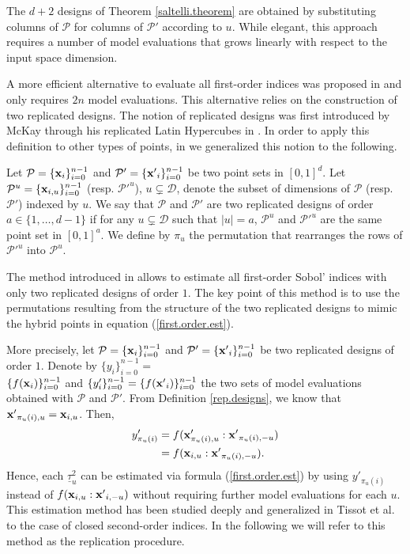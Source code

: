 The $d+2$ designs of Theorem \ref{saltelli.theorem} are obtained by substituting columns of $\mathcal{P}$ for columns of $\mathcal{P}'$ {\color{purple}according} to $u$. While elegant, this approach requires a number of model evaluations that grows linearly with respect to the input space dimension.

A more efficient alternative to evaluate all first-order indices was proposed in \cite{Mara} and only requires $2n$ model evaluations. This alternative relies on the construction of two replicated designs. The notion of replicated designs was first introduced by McKay through his replicated Latin Hypercubes in \cite{McKay}. In order to apply this definition to other types of points, in \cite{GJAHMP} we generalized this notion to the following.
\begin{definition}
\label{rep.designs}
Let $\mathcal{P}=\{\boldsymbol{\mathbf{x}}_i\}_{i=0}^{n-1}$ and $\mathcal{P}'=\{{\boldsymbol{\mathbf{x}}'}_i\}_{i=0}^{n-1}$ be two point sets in
$[0,1]^{d}$. Let $\mathcal{P}^u=\{\boldsymbol{\mathbf{x}}_{i,u}\}_{i=0}^{n-1}$ (resp. ${\mathcal{P}'}^u$), $u \subsetneq \mathcal{D}$, denote the subset of dimensions of $\mathcal{P}$ (resp. $\mathcal{P}'$) indexed by $u$. We say that $\mathcal{P}$ and $\mathcal{P}'$ are two replicated designs of order $a \in \{1,\dots,d-1\}$ if for any $u \subsetneq \mathcal{D}$ such that $|u|=a$, $\mathcal{P}^u$ and ${\mathcal{P}'}^u$ are the same point set in $[0,1]^a$. We define by $\pi_u$ the permutation that rearranges the rows of ${\mathcal{P}'}^u$ into $\mathcal{P}^u$.
\end{definition}
The method introduced in \cite{Mara} allows to estimate all first-order Sobol' indices with only two replicated designs of order $1$. The key point of this method is to use the permutations resulting from the structure of the two replicated designs to mimic the hybrid points in equation (\ref{first.order.est}). 

More precisely, let $\mathcal{P}=\{\boldsymbol{\mathbf{x}}_i\}_{i=0}^{n-1}$ and $\mathcal{P}'=\{{\boldsymbol{\mathbf{x}}'}_i\}_{i=0}^{n-1}$ be two replicated designs of order $1$. Denote by $\{y_i\}_{i=0}^{n-1}=$\\$\{f(\boldsymbol{\mathbf{x}}_i)\}_{i=0}^{n-1}$ and $\{y'_i\}_{i=0}^{n-1}=\{f({\boldsymbol{\mathbf{x}}'}_i)\}_{i=0}^{n-1}$ the two sets of model evaluations obtained with $\mathcal{P}$ and $\mathcal{P}'$. From Definition \ref{rep.designs}, we know that ${\boldsymbol{\mathbf{x}}'}_{\pi_u(i),u}={\boldsymbol{\mathbf{x}}}_{i,u}$. Then,
\begin{align*}
y'_{\pi_u(i)}&= f(\boldsymbol{\mathbf{x}}'_{\pi_u(i),u}:{\boldsymbol{\mathbf{x}}'}_{\pi_u(i),-u}) \\
&= f(\boldsymbol{\mathbf{x}}_{i,u}:{\boldsymbol{\mathbf{x}}'}_{\pi_u(i),-u}).
\end{align*}
Hence, each $\underline{\tau}^2_u$ can be estimated via formula (\ref{first.order.est}) by using $y'_{\pi_u(i)}$ instead of $f(\boldsymbol{\mathbf{x}}_{i,u}:{\boldsymbol{\mathbf{x}}'}_{i,-u})$ without requiring further model evaluations for each $u$. This estimation method has been studied deeply and generalized in Tissot et al. \cite{Tissot} to the case of closed second-order indices. In the following we will refer to this method as the replication procedure.

